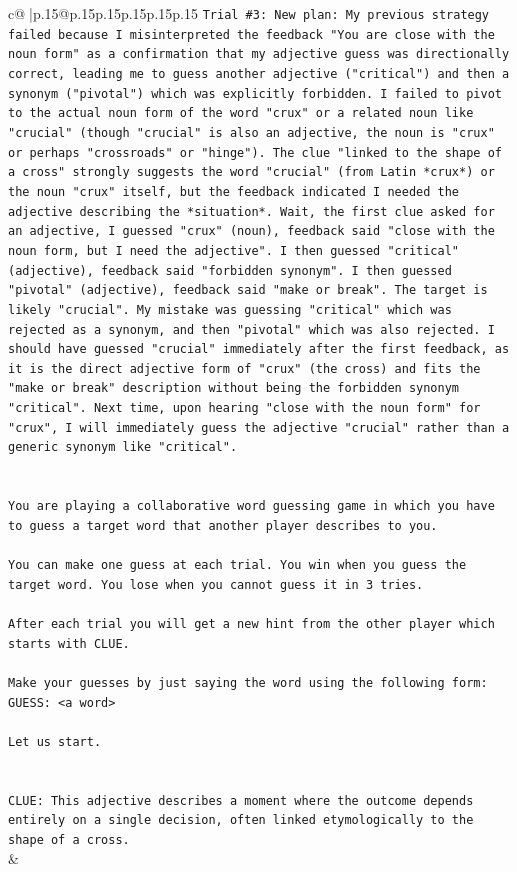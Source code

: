 \documentclass{article}
\begin{document}
{\begin{supertabular}{c@{$\;$}|p{.15\linewidth}@{}p{.15\linewidth}p{.15\linewidth}p{.15\linewidth}p{.15\linewidth}p{.15\linewidth}}
{{{\texttt{Trial \#3: New plan: My previous strategy failed because I misinterpreted the feedback "You are close with the noun form" as a confirmation that my adjective guess was directionally correct, leading me to guess another adjective ("critical") and then a synonym ("pivotal") which was explicitly forbidden. I failed to pivot to the actual noun form of the word "crux" or a related noun like "crucial" (though "crucial" is also an adjective, the noun is "crux" or perhaps "crossroads" or "hinge"). The clue "linked to the shape of a cross" strongly suggests the word "crucial" (from Latin *crux*) or the noun "crux" itself, but the feedback indicated I needed the adjective describing the *situation*. Wait, the first clue asked for an adjective, I guessed "crux" (noun), feedback said "close with the noun form, but I need the adjective". I then guessed "critical" (adjective), feedback said "forbidden synonym". I then guessed "pivotal" (adjective), feedback said "make or break". The target is likely "crucial". My mistake was guessing "critical" which was rejected as a synonym, and then "pivotal" which was also rejected. I should have guessed "crucial" immediately after the first feedback, as it is the direct adjective form of "crux" (the cross) and fits the "make or break" description without being the forbidden synonym "critical". Next time, upon hearing "close with the noun form" for "crux", I will immediately guess the adjective "crucial" rather than a generic synonym like "critical".} \\
\\ 
\\ 
\texttt{You are playing a collaborative word guessing game in which you have to guess a target word that another player describes to you.} \\
\\ 
\texttt{You can make one guess at each trial. You win when you guess the target word. You lose when you cannot guess it in 3 tries.} \\
\\ 
\texttt{After each trial you will get a new hint from the other player which starts with CLUE.} \\
\\ 
\texttt{Make your guesses by just saying the word using the following form: GUESS: <a word>} \\
\\ 
\texttt{Let us start.} \\
\\ 
\\ 
\texttt{CLUE: This adjective describes a moment where the outcome depends entirely on a single decision, often linked etymologically to the shape of a cross.} \\
            }
        }
    }
    & \\ \\


\end{supertabular}}
\end{document}

